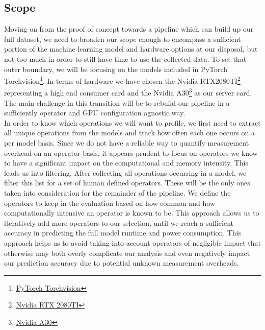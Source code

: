 \documentclass[conference]{IEEEtran}
\begin{document}
\subsection{Scope}
Moving on from the proof of concept towards a pipeline which can build up our full dataset, we need to broaden our scope enough to encompass a sufficient portion of the machine learning model and hardware options at our disposal, but not too much in order to still have time to use the collected data.
To set that outer boundary, we will be focusing on the models included in PyTorch Torchvision\footnote{\href{https://pytorch.org/vision/stable/index.html}{PyTorch Torchvision}}. In terms of hardware we have chosen the Nvidia RTX2080TI\footnote{\href{https://www.techpowerup.com/gpu-specs/geforce-rtx-2080-ti.c3305}{Nvidia RTX 2080TI}} representing a high end consumer card and the Nvidia A30\footnote{\href{https://www.techpowerup.com/gpu-specs/a30-pcie.c3792}{Nvidia A30}} as our server card. The main challenge in this transition will be to rebuild our pipeline in a sufficiently operator and GPU configuration agnostic way. \\
In order to know which operations we will want to profile, we first need to extract all unique operations from the models and track how often each one occurs on a per model basis. Since we do not have a reliable way to quantify measurement overhead on an operator basis, it appears prudent to focus on operators we know to have a significant impact on the computational and memory intensity. This leads us into filtering. After collecting all operations occurring in a model, we filter this list for a set of human defined operators. These will be the only ones taken into consideration for the remainder of the pipeline. We define the operators to keep in the evaluation based on how common and how computationally intensive an operator is known to be. This approach allows us to iteratively add more operators to our selection, until we reach a sufficient accuracy in predicting the full model runtime and power consumption. This approach helps us to avoid taking into account operators of negligible impact that otherwise may both overly complicate our analysis and even negatively impact our prediction accuracy due to potential unknown measurement overheads. 
\end{document}
